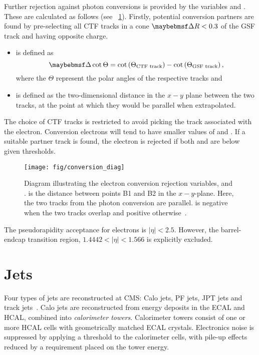Further rejection against photon conversions is provided by the variables
\Distnm and \DeltaCotThetanm. These are calculated as follows (see
\fig~\ref{fig:conversion_diag}). Firstly, potential conversion partners are
found by pre-selecting all \ac{CTF} tracks in a cone $\DeltaR < 0.3$ of the
\ac{GSF} track and having opposite charge.
\begin{itemize}
\item \DeltaCotThetanm is defined as
\begin{equation*}
  \DeltaCotThetanm = \cot\left(\Theta_{\textrm{CTF track}}\right) - \cot\left(\Theta_{\textrm{GSF track}}\right),
\end{equation*}
where the $\Theta$ represent the polar angles of the respective tracks and
\item \Distnm is defined as the two-dimensional distance in the $x-y$ plane
  between the two tracks, at the point at which they would be parallel when
  extrapolated.
\end{itemize}
The choice of \ac{CTF} tracks is restricted to avoid picking the track
associated with the electron. Conversion electrons will tend to have smaller
values of \DeltaCotTheta and \Dist. If a suitable partner track is found, the
electron is rejected if both \Dist and \DeltaCotTheta are below given
thresholds.

\begin{figure}[h!]
  \centering
  \texttt{[image: fig/conversion\_diag]}
  \caption[Diagram illustrating electron conversion rejection variables]{Diagram
    illustrating the electron conversion rejection variables, \Distnm and
    \DeltaCotThetanm. \Distnm is the distance between points B1 and B2 in the
    $x-y$-plane. Here, the two tracks from the photon conversion are
    parallel. \Distnm is negative when the two tracks overlap and positive
    otherwise~\cite{cms_an_2009_159}.}
  \label{fig:conversion_diag}
\end{figure}

The pseudorapidity acceptance for electrons is $|\eta| < 2.5$. However, the
barrel-endcap transition region, $1.4442 < |\eta| < 1.566$ is explicitly excluded.



\section{Jets}
\label{sec:reco_jets}
Four types of jets are reconstructed at \ac{CMS}: \acf{Calo} jets, \ac{PF} jets,
\ac{JPT} jets and track jets~\cite{jet_perf_pas}. \ac{Calo} jets are
reconstructed from energy deposits in the \ac{ECAL} and \ac{HCAL}, combined into
\emph{calorimeter towers}. Calorimeter towers consist of one or more \ac{HCAL} cells
with geometrically matched \ac{ECAL} crystals. Electronics noise is suppressed
by applying a threshold to the calorimeter cells, with pile-up effects reduced
by a requirement placed on the tower energy.

